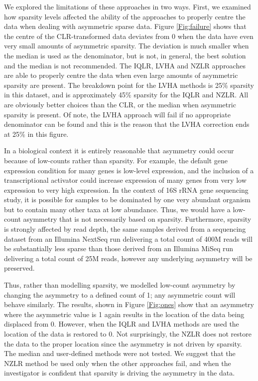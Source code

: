 \documentclass{bmcart}
\begin{document}
We  explored the limitations of these approaches in two ways. First, we examined how  sparsity levels affected the ability of the approaches to properly centre the data when dealing with asymmetric sparse data. Figure \ref{Fig:failure} shows that the centre of the CLR-transformed data deviates from 0 when the data have even very small amounts of asymmetric sparsity. The deviation is much smaller when the median is used as the denominator, but is not, in general, the best solution and the median is not recommended. The IQLR, LVHA and NZLR approaches are able to properly centre the data when even large amounts of asymmetric sparsity are present. The breakdown point for the LVHA methods is 25\% sparsity in this dataset, and is approximately  45\% sparsity for the  IQLR and NZLR. All are obviously better choices than the CLR, or the median when asymmetric sparsity is present. Of note, the LVHA approach will fail if no appropriate denominator can be found and this is the reason that the LVHA correction ends at 25\% in this figure. 

In a biological context it is entirely reasonable that asymmetry could occur because of low-counts  rather than sparsity. For example, the default gene expression condition for many genes is low-level expression, and the inclusion of a transcriptional activator could increase expression of many genes from very low expression to very high expression. In the context of 16S rRNA gene sequencing study, it is possible for samples to be dominated by one very abundant organism but to contain many other taxa at low abundance. Thus, we would have a low-count asymmetry that is not necessarily based on sparsity. Furthermore, sparsity is strongly affected by read depth, the same samples derived from a sequencing dataset from an Illumina NextSeq run delivering a total count of 400M reads will be substantially less sparse than those derived from an Illumina MiSeq run delivering a total count of 25M reads, however any underlying asymmetry will be preserved.

Thus, rather than modelling sparsity, we modelled low-count asymmetry by changing the asymmetry to a defined count of 1; any asymmetric count will behave similarly. The results, shown in Figure \ref{Fig:ones} show that an asymmetry where the asymmetric value is 1 again results in the location of the data being displaced from 0. However, when the IQLR and LVHA methods are used the location of the data is restored to 0. Not surprisingly, the NZLR does not restore the data to the proper location since the asymmetry is not driven by sparsity. The median and user-defined methods were not tested. We suggest that the NZLR method be used only when the other approaches fail, and when the investigator is confident that sparsity is driving the asymmetry in the data. 
\end{document}
